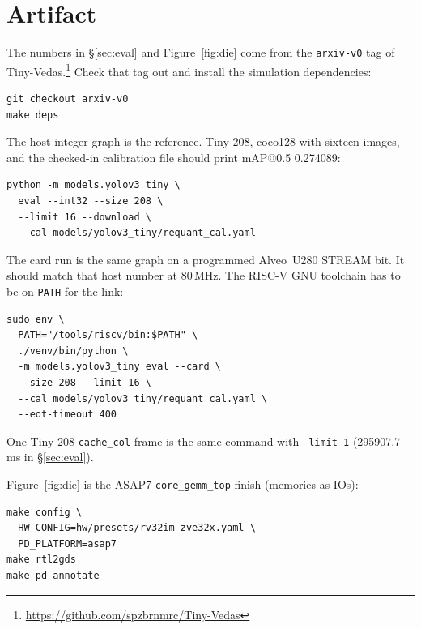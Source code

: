 \section{Artifact}
\label{app:artifact}

The numbers in \S\ref{sec:eval} and Figure~\ref{fig:die} come from
the \texttt{arxiv-v0} tag of
Tiny-Vedas.\footnote{\url{https://github.com/spzbrnmrc/Tiny-Vedas}}
Check that tag out and install the simulation dependencies:
\tvcmdopen
\begin{lstlisting}
git checkout arxiv-v0
make deps
\end{lstlisting}
\tvcmdclose

The host integer graph is the reference. Tiny-208, coco128 with
sixteen images, and the checked-in calibration file should print
{mAP@0.5} 0.274089:
\tvcmdopen
\begin{lstlisting}
python -m models.yolov3_tiny \
  eval --int32 --size 208 \
  --limit 16 --download \
  --cal models/yolov3_tiny/requant_cal.yaml
\end{lstlisting}
\tvcmdclose

The card run is the same graph on a programmed Alveo~{U280} STREAM
bit. It should match that host number at 80\,{MHz}. The RISC-V
GNU toolchain has to be on \texttt{PATH} for the link:
\tvcmdopen
\begin{lstlisting}
sudo env \
  PATH="/tools/riscv/bin:$PATH" \
  ./venv/bin/python \
  -m models.yolov3_tiny eval --card \
  --size 208 --limit 16 \
  --cal models/yolov3_tiny/requant_cal.yaml \
  --eot-timeout 400
\end{lstlisting}
\tvcmdclose

One Tiny-208 \texttt{cache\_col} frame is the same command with
\texttt{--limit 1} (295907.7\,{ms} in \S\ref{sec:eval}).

Figure~\ref{fig:die} is the {ASAP7} \texttt{core\_gemm\_top} finish
(memories as {IOs}):
\tvcmdopen
\begin{lstlisting}
make config \
  HW_CONFIG=hw/presets/rv32im_zve32x.yaml \
  PD_PLATFORM=asap7
make rtl2gds
make pd-annotate
\end{lstlisting}
\tvcmdclose
